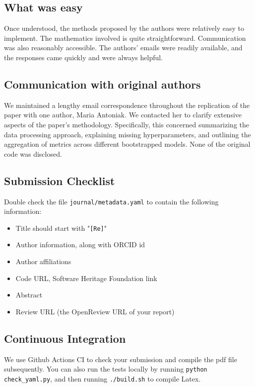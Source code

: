 \subsection*{What was easy}
Once understood, the methods proposed by the authors were relatively easy to implement. The mathematics involved is quite straightforward. Communication was also reasonably accessible. The authors' emails were readily available, and the responses came quickly and were always helpful.

\subsection*{Communication with original authors}
We maintained a lengthy email correspondence throughout the replication of the paper with one author, Maria Antoniak. We contacted her to clarify extensive aspects of the paper's methodology. Specifically, this concerned summarizing the data processing approach,  explaining missing hyperparameters, and outlining the aggregation of metrics across different bootstrapped models. None of the original code was disclosed.

\subsection{Submission Checklist}

Double check the file \texttt{journal/metadata.yaml} to contain the following information:

\begin{itemize}
	\item Title should start with "\texttt{[Re]}"
	\item Author information, along with ORCID id
	\item Author affiliations
	\item Code URL, Software Heritage Foundation link
	\item Abstract
	\item Review URL (the OpenReview URL of your report)
\end{itemize}

\subsection{Continuous Integration}

We use Github Actions CI to check your submission and compile the pdf file subsequently.
You can also run the tests locally by running \texttt{python check\_yaml.py}, and then running \texttt{./build.sh} to compile Latex.

